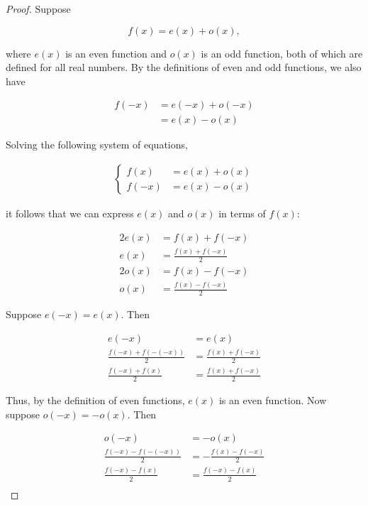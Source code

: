 \documentclass{article}
\begin{document}
    \begin{proof}
        Suppose

        \[
            f(x) = e(x) + o(x),
        \]

        \noindent where $e(x)$ is an even function and $o(x)$ is an odd function, both of which are defined for all real numbers. By the definitions of even and odd functions, we also have

        \begin{align*}
            f(-x)   &= e(-x) + o(-x) \\
                    &= e(x) - o(x)
        \end{align*}

        \noindent Solving the following system of equations,

        \begin{align*}
            \begin{cases}
                f(x) &= e(x) + o(x) \\
                f(-x) &= e(x) - o(x)
            \end{cases}
        \end{align*}

        \noindent it follows that we can express $e(x)$ and $o(x)$ in terms of $f(x)$:

        \begin{align*}
            2e(x) &= f(x) + f(-x) \\
            e(x)  &= \frac{f(x) + f(-x)}{2} \\
            2o(x) &= f(x) - f(-x) \\
            o(x)  &= \frac{f(x)-f(-x)}{2}
        \end{align*}

        \noindent Suppose $e(-x)=e(x)$. Then

        \begin{align*}
            e(-x)                       &=  e(x) \\
            \frac{f(-x)+f(-(-x))}{2}    &= \frac{f(x)+f(-x)}{2} \\
            \frac{f(-x)+f(x)}{2}       &= \frac{f(x)+f(-x)}{2}
        \end{align*}

        \noindent Thus, by the definition of even functions, $e(x)$ is an even function. Now suppose $o(-x)=-o(x)$. Then

        \begin{align*}
            o(-x)                       &= -o(x) \\
            \frac{f(-x)-f(-(-x))}{2}    &= -\frac{f(x)-f(-x)}{2} \\
            \frac{f(-x)-f(x)}{2}        &= \frac{f(-x)-f(x)}{2} \\
        \end{align*}


\end{proof}
\end{document}
